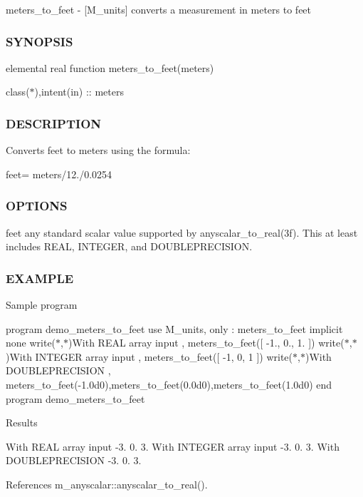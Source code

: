 meters\+\_\+to\+\_\+feet -\/ \mbox{[}M\+\_\+units\mbox{]} converts a measurement in meters to feet \subsubsection*{S\+Y\+N\+O\+P\+S\+IS}

elemental real function meters\+\_\+to\+\_\+feet(meters)

class($\ast$),intent(in) \+:\+: meters \subsubsection*{D\+E\+S\+C\+R\+I\+P\+T\+I\+ON}

Converts feet to meters using the formula\+:

feet= meters/12./0.0254 \subsubsection*{O\+P\+T\+I\+O\+NS}

feet any standard scalar value supported by anyscalar\+\_\+to\+\_\+real(3f). This at least includes R\+E\+AL, I\+N\+T\+E\+G\+ER, and D\+O\+U\+B\+L\+E\+P\+R\+E\+C\+I\+S\+I\+ON. \subsubsection*{E\+X\+A\+M\+P\+LE}

Sample program

program demo\+\_\+meters\+\_\+to\+\_\+feet use M\+\_\+units, only \+: meters\+\_\+to\+\_\+feet implicit none write($\ast$,$\ast$)\textquotesingle{}With R\+E\+AL array input \textquotesingle{}, meters\+\_\+to\+\_\+feet(\mbox{[} -\/1., 0., 1. \mbox{]}) write($\ast$,$\ast$)\textquotesingle{}With I\+N\+T\+E\+G\+ER array input \textquotesingle{}, meters\+\_\+to\+\_\+feet(\mbox{[} -\/1, 0, 1 \mbox{]}) write($\ast$,$\ast$)\textquotesingle{}With D\+O\+U\+B\+L\+E\+P\+R\+E\+C\+I\+S\+I\+ON \textquotesingle{}, meters\+\_\+to\+\_\+feet(-\/1.\+0d0),meters\+\_\+to\+\_\+feet(0.\+0d0),meters\+\_\+to\+\_\+feet(1.\+0d0) end program demo\+\_\+meters\+\_\+to\+\_\+feet

Results

With R\+E\+AL array input -\/3. 0. 3. With I\+N\+T\+E\+G\+ER array input -\/3. 0. 3. With D\+O\+U\+B\+L\+E\+P\+R\+E\+C\+I\+S\+I\+ON -\/3. 0. 3. 

References m\+\_\+anyscalar\+::anyscalar\+\_\+to\+\_\+real().

